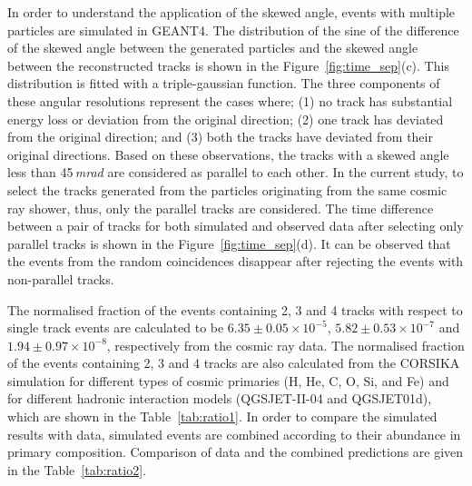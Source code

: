 In order to understand the application of the skewed angle, events
with multiple particles are simulated in GEANT4. The distribution of
the sine of the difference of the skewed angle between the generated
particles and the skewed angle between the reconstructed tracks is
shown in the Figure~\ref{fig:time_sep}(c). This distribution is fitted
with a triple-gaussian function. The three components of these angular
resolutions represent the cases where; (1) no track has substantial
energy loss or deviation from the original direction; (2) one track
has deviated from the original direction; and (3) both the tracks have
deviated from their original directions. Based on these observations,
the tracks with a skewed angle less than 45\,\textit{mrad} are
considered as parallel to each other. In the current study, to select
the tracks generated from the particles originating from the same
cosmic ray shower, thus, only the parallel tracks are considered. The
time difference between a pair of tracks for both simulated and
observed data after selecting only parallel tracks is shown in the
Figure~\ref{fig:time_sep}(d). It can be observed that the events from
the random coincidences disappear after rejecting the events with
non-parallel tracks.

The normalised fraction of the events containing 2, 3 and 4 tracks
with respect to single track events are calculated to be
$6.35\pm 0.05\times 10^{-5}$, $5.82\pm 0.53\times 10^{-7}$ and
$1.94\pm 0.97\times 10^{-8}$, respectively from the cosmic ray data.
The normalised fraction of the events containing 2, 3 and 4 tracks are
also calculated from the CORSIKA simulation for different types of
cosmic primaries (H, He, C, O, Si, and Fe) and for different hadronic
interaction models (QGSJET-II-04 and QGSJET01d), which are shown in the
Table~\ref{tab:ratio1}. In order to compare the simulated results with
data, simulated events are combined according to their abundance in
primary composition\cite{cosmic1}. Comparison of data and
the combined predictions are given in the Table~\ref{tab:ratio2}.

